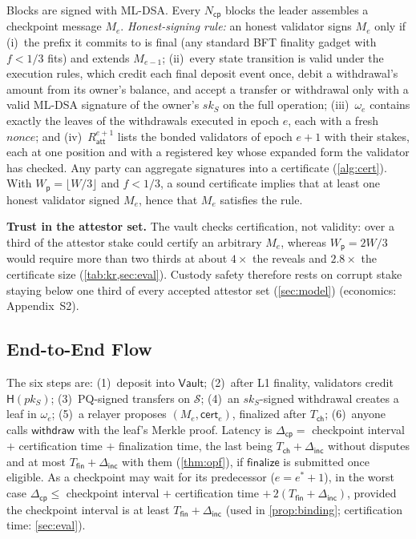 \documentclass[10pt,journal,compsoc]{IEEEtran}
\theoremstyle{tplain}
\theoremstyle{tdef}
\theoremstyle{remark}
\newcommand{\supp}[1]{Appendix~#1}
\newcommand{\Wp}{W_{\mathsf{p}}}
\newcommand{\Ratt}{R_{\mathsf{att}}}
\newcommand{\cert}{\mathsf{cert}}
\newcommand{\Vault}{\mathsf{Vault}}
\newcommand{\Hash}{\mathsf{H}}
\begin{document}
Blocks are signed with ML-DSA. Every $N_{\mathsf{cp}}$ blocks the leader assembles a checkpoint message $M_e$. \emph{Honest-signing rule:} an honest validator signs $M_e$ only if (i)~the prefix it commits to is final (any standard BFT finality gadget with $f<1/3$ fits) and extends $M_{e-1}$; (ii)~every state transition is valid under the execution rules, which credit each final deposit event once, debit a withdrawal's amount from its owner's balance, and accept a transfer or withdrawal only with a valid ML-DSA signature of the owner's $sk_S$ on the full operation; (iii)~$\omega_e$ contains exactly the leaves of the withdrawals executed in epoch $e$, each with a fresh $\mathit{nonce}$; and (iv)~$\Ratt^{e+1}$ lists the bonded validators of epoch $e+1$ with their stakes, each at one position and with a registered key whose expanded form the validator has checked. Any party can aggregate signatures into a certificate (\cref{alg:cert}). With $\Wp=\lfloor W/3\rfloor$ and $f<1/3$, a sound certificate implies that at least one honest validator signed $M_e$, hence that $M_e$ satisfies the rule.

\noindent\textbf{Trust in the attestor set.} The vault checks certification, not validity: over a third of the attestor stake could certify an arbitrary $M_e$, whereas $\Wp=2W/3$ would require more than two thirds at about $4\times$ the reveals and $2.8\times$ the certificate size (\cref{tab:kr,sec:eval}). Custody safety therefore rests on corrupt stake staying below one third of every accepted attestor set (\cref{sec:model}) (economics: \supp{S2}).

\subsection{End-to-End Flow}\label{sec:flow}
The six steps are: (1)~deposit into $\Vault$; (2)~after L1 finality, validators credit $\Hash(pk_S)$; (3)~PQ-signed transfers on $\mathcal S$; (4)~an $sk_S$-signed withdrawal creates a leaf in $\omega_e$; (5)~a relayer proposes $(M_e,\cert_e)$, finalized after $T_{\mathsf{ch}}$; (6)~anyone calls $\mathsf{withdraw}$ with the leaf's Merkle proof. Latency is $\Delta_{\mathsf{cp}}=$ checkpoint interval $+$ certification time $+$ finalization time, the last being $T_{\mathsf{ch}}+\Delta_{\mathsf{inc}}$ without disputes and at most $T_{\mathsf{fin}}+\Delta_{\mathsf{inc}}$ with them (\cref{thm:opf}), if $\mathsf{finalize}$ is submitted once eligible. As a checkpoint may wait for its predecessor ($e=e^\ast+1$), in the worst case $\Delta_{\mathsf{cp}}\le$ checkpoint interval $+$ certification time $+\,2(T_{\mathsf{fin}}+\Delta_{\mathsf{inc}})$, provided the checkpoint interval is at least $T_{\mathsf{fin}}+\Delta_{\mathsf{inc}}$ (used in \cref{prop:binding}; certification time: \cref{sec:eval}).
\end{document}

